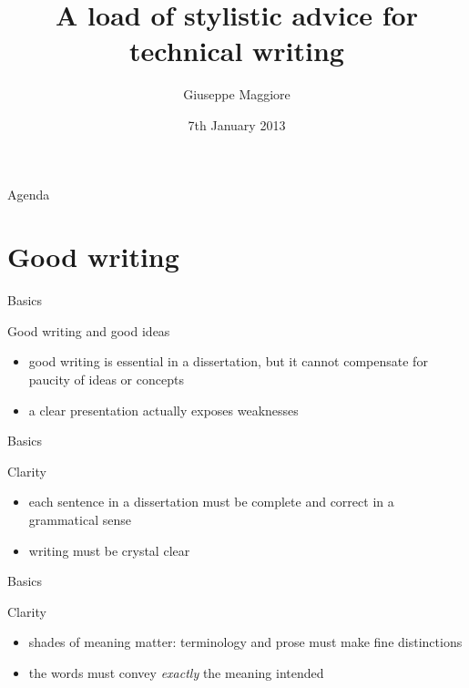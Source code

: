 \documentclass{beamer}
\title{A load of stylistic advice for technical writing}
\author{Giuseppe Maggiore}
\institute{NHTV University of Applied Sciences \\ 
Breda, Netherlands}
\date{7th January 2013}
\begin{document}
\maketitle

\begin{frame}{Agenda}
\tableofcontents
\end{frame}

\section{Good writing}
\begin{frame}{Basics}
\begin{block}{Good writing and good ideas}
\begin{itemize}
\item good writing is essential in a dissertation, but it cannot compensate for paucity of ideas or concepts
\item a clear presentation actually exposes weaknesses
\end{itemize}
\end{block}
\end{frame}

\begin{frame}{Basics}
\begin{block}{Clarity}
\begin{itemize}
\item each sentence in a dissertation must be complete and correct in a grammatical sense
\item writing must be crystal clear
\end{itemize}
\end{block}
\end{frame}

\begin{frame}{Basics}
\begin{block}{Clarity}
\begin{itemize}
\item shades of meaning matter: terminology and prose must make fine distinctions
\item the words must convey \textit{exactly} the meaning intended
\end{itemize}
\end{block}
\end{frame}
\end{document}
